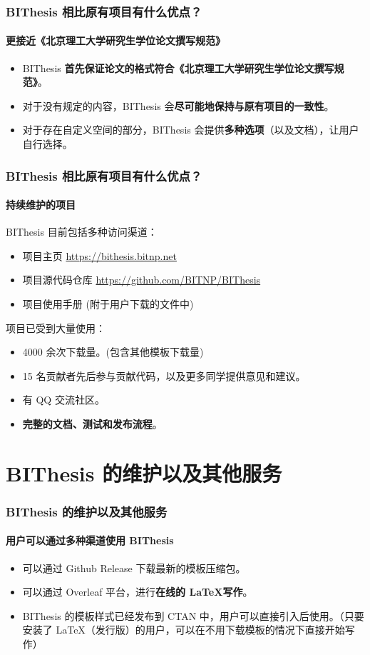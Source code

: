 \documentclass[
  aspectratio=169,
  presentation,
  titlegraphic=./images/bit.png,
  framelogo=./images/bit.png
]{bitbeamer}
\begin{document}
\begin{frame}[t]
  \frametitle{BIThesis 相比原有项目有什么优点？}
  \framesubtitle{更接近《北京理工大学研究生学位论文撰写规范》}

  \begin{itemize}
    \item BIThesis \textbf{首先保证论文的格式符合《北京理工大学研究生学位论文撰写规范》}。
    \item 对于没有规定的内容，BIThesis 会\textbf{尽可能地保持与原有项目的一致性}。
    \item 对于存在自定义空间的部分，BIThesis 会提供\textbf{多种选项}（以及文档），让用户自行选择。
  \end{itemize}
  

\end{frame}

\begin{frame}[t]
  \frametitle{BIThesis 相比原有项目有什么优点？}
  \framesubtitle{持续维护的项目}

  BIThesis 目前包括多种访问渠道：
  \begin{itemize}
    \item 项目主页 \url{https://bithesis.bitnp.net}
    \item 项目源代码仓库 \url{https://github.com/BITNP/BIThesis}
    \item 项目使用手册 (附于用户下载的文件中)
  \end{itemize}

  \vspace{0.5cm}
  
  项目已受到大量使用：
  \begin{itemize}
    \item 4000 余次下载量。(包含其他模板下载量)
    \item 15 名贡献者先后参与贡献代码，以及更多同学提供意见和建议。
    \item 有 QQ 交流社区。
    \item \textbf{完整的文档、测试和发布流程}。
  \end{itemize}
\end{frame}

\section{BIThesis 的维护以及其他服务}

\begin{frame}[t]
  \frametitle{BIThesis 的维护以及其他服务}
  \framesubtitle{用户可以通过\textbf{多种渠道}使用 BIThesis}

\begin{itemize}
  \item 可以通过 Github Release 下载最新的模板压缩包。
  \item 可以通过 Overleaf 平台，进行\textbf{在线的 \LaTeX 写作}。
  \item BIThesis 的模板样式已经发布到 CTAN 中，用户可以直接引入后使用。（只要安装了 \LaTeX （发行版）的用户，可以在不用下载模板的情况下直接开始写作）
\end{itemize}
\end{frame}
\end{document}
